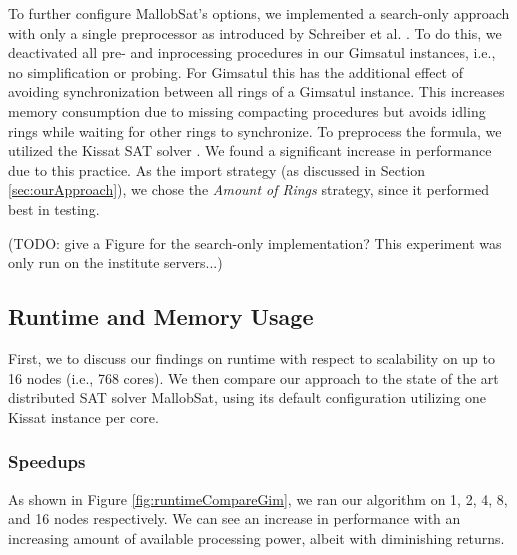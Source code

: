 \documentclass[12pt,a4paper,twoside]{scrartcl}
\numberwithin{equation}{section}
\begin{document}
To further configure MallobSat's options, we implemented a search-only approach with only a single preprocessor as introduced by Schreiber et al. \cite{searchOnlyPaper}. To do this, we deactivated all pre- and inprocessing procedures in our Gimsatul instances, i.e., no simplification or probing. For Gimsatul this has the additional effect of avoiding synchronization between all rings of a Gimsatul instance. This increases memory consumption due to missing compacting procedures but avoids idling rings while waiting for other rings to synchronize. To preprocess the formula, we utilized the Kissat SAT solver \cite{kissat}. We found a significant increase in performance due to this practice. As the import strategy (as discussed in Section \ref{sec:ourApproach}), we chose the \textit{Amount of Rings} strategy, since it performed best in testing.

(TODO: give a Figure for the search-only implementation? This experiment was only run on the institute servers...)

\subsection{Runtime and Memory Usage}

First, we to discuss our findings on runtime with respect to scalability on up to 16 nodes (i.e., 768 cores). We then compare our approach to the state of the art distributed SAT solver MallobSat, using its default configuration utilizing one Kissat instance per core.

\subsubsection{Speedups}

As shown in Figure \ref{fig:runtimeCompareGim}, we ran our algorithm on 1, 2, 4, 8, and 16 nodes respectively. We can see an increase in performance with an increasing amount of available processing power, albeit with diminishing returns.
\end{document}
